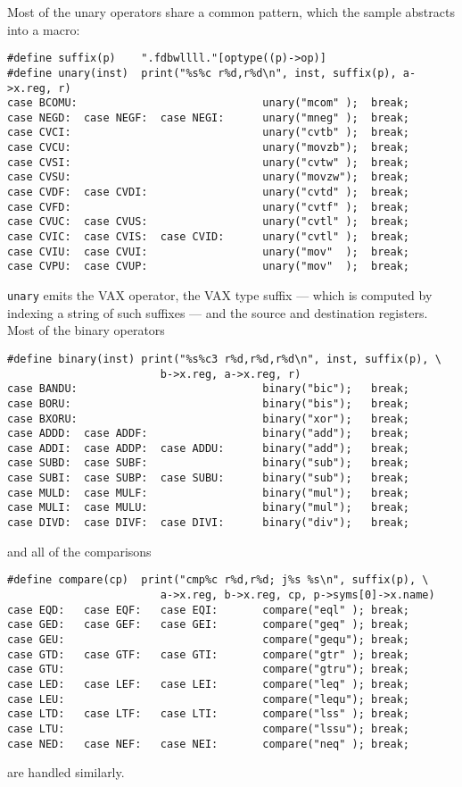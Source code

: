 Most of the unary operators share a common pattern, which the sample
abstracts into a macro:
\begin{verbatim}
#define suffix(p)    ".fdbwllll."[optype((p)->op)]
#define unary(inst)  print("%s%c r%d,r%d\n", inst, suffix(p), a->x.reg, r)
case BCOMU:                             unary("mcom" );  break;
case NEGD:  case NEGF:  case NEGI:      unary("mneg" );  break;
case CVCI:                              unary("cvtb" );  break;
case CVCU:                              unary("movzb");  break;
case CVSI:                              unary("cvtw" );  break;
case CVSU:                              unary("movzw");  break;
case CVDF:  case CVDI:                  unary("cvtd" );  break;
case CVFD:                              unary("cvtf" );  break;
case CVUC:  case CVUS:                  unary("cvtl" );  break;
case CVIC:  case CVIS:  case CVID:      unary("cvtl" );  break;
case CVIU:  case CVUI:                  unary("mov"  );  break;
case CVPU:  case CVUP:                  unary("mov"  );  break;
\end{verbatim}
\verb|unary| emits the VAX operator, the VAX type suffix --- which is
computed by indexing a string of such suffixes --- and the source and
destination registers. Most of the binary operators
\begin{verbatim}
#define binary(inst) print("%s%c3 r%d,r%d,r%d\n", inst, suffix(p), \
                        b->x.reg, a->x.reg, r)
case BANDU:                             binary("bic");   break;
case BORU:                              binary("bis");   break;
case BXORU:                             binary("xor");   break;
case ADDD:  case ADDF:                  binary("add");   break;
case ADDI:  case ADDP:  case ADDU:      binary("add");   break;
case SUBD:  case SUBF:                  binary("sub");   break;
case SUBI:  case SUBP:  case SUBU:      binary("sub");   break;
case MULD:  case MULF:                  binary("mul");   break;
case MULI:  case MULU:                  binary("mul");   break;
case DIVD:  case DIVF:  case DIVI:      binary("div");   break;
\end{verbatim}
and all of the comparisons
\begin{verbatim}
#define compare(cp)  print("cmp%c r%d,r%d; j%s %s\n", suffix(p), \
                        a->x.reg, b->x.reg, cp, p->syms[0]->x.name)
case EQD:   case EQF:   case EQI:       compare("eql" ); break;
case GED:   case GEF:   case GEI:       compare("geq" ); break;
case GEU:                               compare("gequ"); break;
case GTD:   case GTF:   case GTI:       compare("gtr" ); break;
case GTU:                               compare("gtru"); break;
case LED:   case LEF:   case LEI:       compare("leq" ); break;
case LEU:                               compare("lequ"); break;
case LTD:   case LTF:   case LTI:       compare("lss" ); break;
case LTU:                               compare("lssu"); break;
case NED:   case NEF:   case NEI:       compare("neq" ); break;
\end{verbatim}
are handled similarly.

